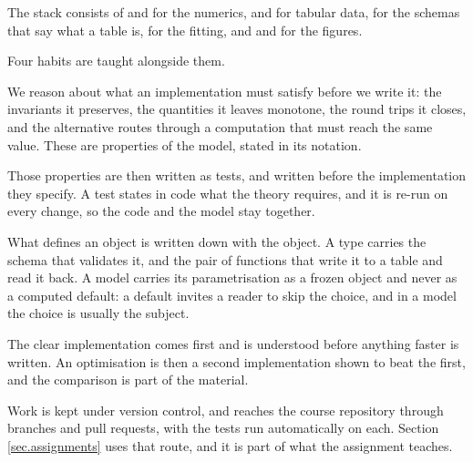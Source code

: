 The stack consists of
 and  for the numerics,
 and  for tabular data,
 for the schemas that say what a table is,
 for the fitting,
and  and  for the figures.

Four habits are taught alongside them.

We reason about what an implementation must satisfy before we write it:
the invariants it preserves,
the quantities it leaves monotone,
the round trips it closes,
and the alternative routes through a computation that must reach the same value.
These are properties of the model, stated in its notation.

Those properties are then written as tests,
and written before the implementation they specify.
A test states in code what the theory requires,
and it is re-run on every change,
so the code and the model stay together.

What defines an object is written down with the object.
A type carries the schema that validates it,
and the pair of functions that write it to a table and read it back.
A model carries its parametrisation as a frozen object and never as a computed default:
a default invites a reader to skip the choice,
and in a model the choice is usually the subject.

The clear implementation comes first and is understood before anything faster is written.
An optimisation is then a second implementation shown to beat the first,
and the comparison is part of the material.

Work is kept under version control,
and reaches the course repository through branches and pull requests,
with the tests run automatically on each.
Section \ref{sec.assignments} uses that route,
and it is part of what the assignment teaches.
